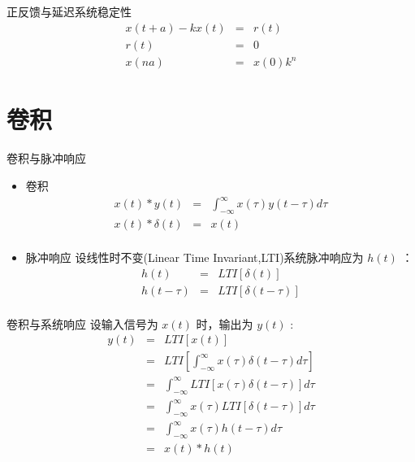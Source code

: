 \documentclass[presentation]{beamer}
\begin{document}
\begin{frame}[label={sec:org0b4d67d}]{正反馈与延迟系统稳定性}
\begin{eqnarray*}
x(t+a)-kx(t) &=& r(t) \\
r(t) &=& 0 \\
x(na) &=& x(0)k^{n}
\end{eqnarray*}
\end{frame}

\section{卷积}
\label{sec:orgab68dcb}
\begin{frame}[label={sec:orga41e410}]{卷积与脉冲响应}
\begin{itemize}
\item 卷积
\begin{eqnarray*}
x(t)*y(t) &=& \int_{-\infty}^{\infty}x(\tau)y(t-\tau)d\tau \\
x(t)*\delta(t)& = & x(t) \\
\end{eqnarray*}
\end{itemize}
\begin{itemize}
\item 脉冲响应
设线性时不变(Linear Time Invariant,LTI)系统脉冲响应为 \(h(t)\) ：
\begin{eqnarray*}
h(t) &=& LTI[\delta(t)]\\
h(t-\tau) &=& LTI[\delta(t-\tau)]\\
\end{eqnarray*}
\end{itemize}
\end{frame}

\begin{frame}[label={sec:org1d02ea2}]{卷积与系统响应}
设输入信号为 \(x(t)\) 时，输出为 \(y(t)\) :
\begin{eqnarray*}
y(t) & =& LTI[x(t)]\\
     &=& LTI\left[\int_{-\infty}^{\infty}x(\tau)\delta(t-\tau)d\tau\right] \\
     &=& \int_{-\infty}^{\infty} LTI[x(\tau)\delta(t-\tau)]d\tau \\
     &=& \int_{-\infty}^{\infty} x(\tau)LTI[\delta(t-\tau)]d\tau \\
     &=& \int_{-\infty}^{\infty} x(\tau) h(t-\tau)d\tau \\
     &=& x(t) * h(t)
\end{eqnarray*}
\end{frame}
\end{document}
